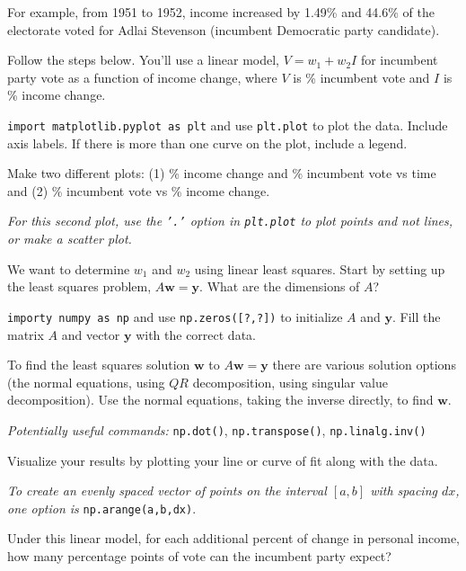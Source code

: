 \documentclass[12pt,letterpaper,noanswers]{exam}
\newcommand{\vc}[1]{\boldsymbol{#1}}
\begin{document}
\begin{questions}
For example, from 1951 to 1952, income increased by 1.49\% and 44.6\% of the electorate voted for Adlai Stevenson (incumbent Democratic party candidate).

Follow the steps below.  You'll use a linear model, $V = w_1 + w_2 I$ for incumbent party vote as a function of income change, where $V$ is \% incumbent vote and $I$ is \% income change.



\begin{parts}
\item \texttt{import matplotlib.pyplot as plt} and use \texttt{plt.plot} to plot the data.  Include axis labels.  If there is more than one curve on the plot, include a legend.

Make two different plots: (1) \% income change and \% incumbent vote vs time and (2) \% incumbent vote vs \% income change.  

\emph{For this second plot, use the \texttt{'.'} option in \texttt{plt.plot} to plot points and not lines, or make a scatter plot.}

\item We want to determine $w_1$ and $w_2$ using linear least squares.  Start by setting up the least squares problem, $A \vc{w} = \vc{y}$.  What are the dimensions of $A$?

\texttt{importy numpy as np} and use \texttt{np.zeros([?,?])} to initialize $A$ and $\vc{y}$.  Fill the matrix $A$ and vector $\vc{y}$ with the correct data.

\item To find the least squares solution $\vc{w}$ to $A\vc{w} = \vc{y}$ there are various solution options (the normal equations, using $QR$ decomposition, using singular value decomposition).  Use the normal equations, taking the inverse directly, to find $\vc{w}$.

\emph{Potentially useful commands:} \texttt{np.dot()}, \texttt{np.transpose()}, \texttt{np.linalg.inv()}

\item Visualize your results by plotting your line or curve of fit along with the data.

\emph{To create an evenly spaced vector of points on the interval $[a,b]$ with spacing $dx$, one option is }\texttt{np.arange(a,b,dx)}.

\item Under this linear model, for each additional percent of change in personal income, how many percentage points of vote can the incumbent party expect?
\end{parts}


\end{questions}
\end{document}
